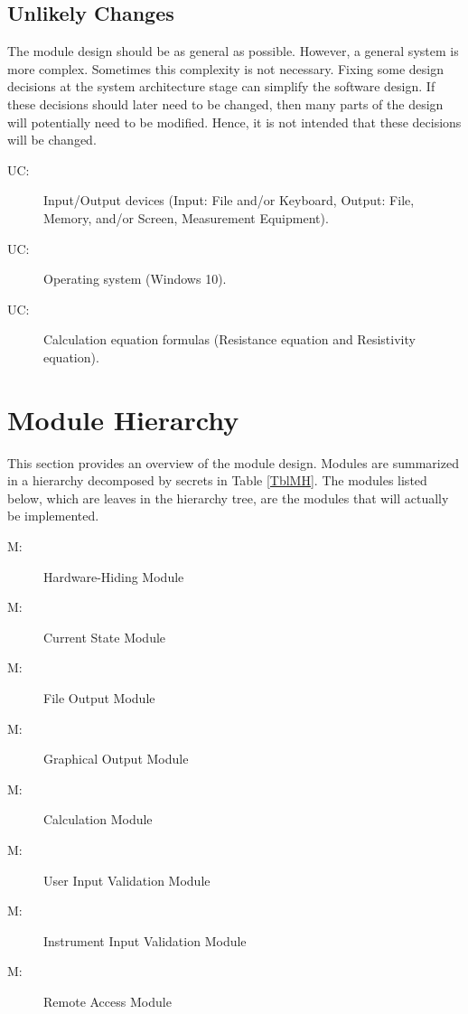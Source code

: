 \documentclass[12pt, titlepage]{article}
\newcounter{ucnum}
\newcommand{\uctheucnum}{UC\theucnum}
\newcounter{mnum}
\newcommand{\mthemnum}{M\themnum}
\begin{document}
\subsection{Unlikely Changes} \label{SecUchange}

The module design should be as general as possible. However, a general system is
more complex. Sometimes this complexity is not necessary. Fixing some design
decisions at the system architecture stage can simplify the software design. If
these decisions should later need to be changed, then many parts of the design
will potentially need to be modified. Hence, it is not intended that these
decisions will be changed.

\begin{description}
\item[ \uctheucnum \label{ucIO}:] Input/Output devices
  (Input: File and/or Keyboard, Output: File, Memory, and/or Screen, Measurement Equipment).
\item[ \uctheucnum \label{ucOS}:] Operating system (Windows 10).
\item[ \uctheucnum \label{ucCalculation}:] Calculation equation formulas (Resistance equation and Resistivity equation).
\end{description}

\section{Module Hierarchy} \label{SecMH}

This section provides an overview of the module design. Modules are summarized
in a hierarchy decomposed by secrets in Table \ref{TblMH}. The modules listed
below, which are leaves in the hierarchy tree, are the modules that will
actually be implemented.

\begin{description}
\item [ \mthemnum \label{mHH}:] Hardware-Hiding Module
\item [ \mthemnum \label{mCS}:] Current State Module
\item [ \mthemnum \label{mFO}:] File Output Module
\item [ \mthemnum \label{mGO}:] Graphical Output Module
\item [ \mthemnum \label{mC}:] Calculation Module
\item [ \mthemnum \label{mUI}:] User Input Validation Module
\item [ \mthemnum \label{mII}:] Instrument Input Validation Module
\item [ \mthemnum \label{mRA}:] Remote Access Module
\end{description}
\end{document}
